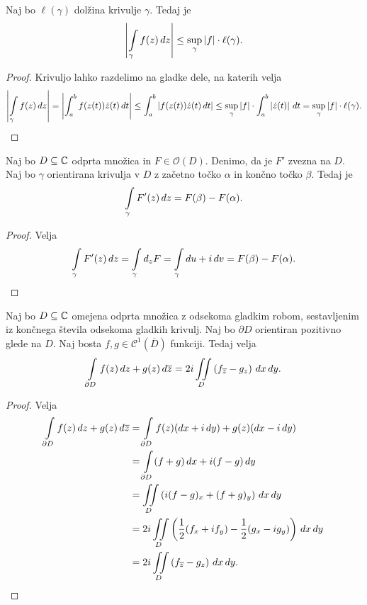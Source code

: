 \begin{trditev}
Naj bo $\ell(\gamma)$ dolžina krivulje $\gamma$. Tedaj je
\[
\left\lvert \int\limits_{\gamma} f(z)\,dz\right\rvert \leq
\sup_{\gamma} \left\lvert f\right\rvert \cdot \ell(\gamma).
\]
\end{trditev}

\begin{proof}
Krivuljo lahko razdelimo na gladke dele, na katerih velja
\[
\left\lvert \int\limits_{\gamma} f(z)\,dz\right\rvert =
\left\lvert \int_a^b f(z(t)) \dot{z}(t)\,dt\right\rvert \leq
\int_a^b \left\lvert f(z(t)) \dot{z}(t)\,dt\right\rvert \leq
\sup_{\gamma} \left\lvert f\right\rvert \cdot \int_a^b \left\lvert \dot{z}(t)\right\rvert\,dt =
\sup_{\gamma} \left\lvert f\right\rvert \cdot \ell(\gamma). \qedhere
\]
\end{proof}

\begin{trditev}
Naj bo $D \subseteq \mathbb{C}$ odprta množica in $F \in \mathcal{O}(D)$.
Denimo, da je $F'$ zvezna na $D$. Naj bo $\gamma$ orientirana
krivulja v $D$ z začetno točko $\alpha$ in končno točko $\beta$.
Tedaj je
\[
\int\limits_{\gamma} F'(z)\,dz = F(\beta) - F(\alpha).
\]
\end{trditev}

\begin{proof}
Velja
\[
\int\limits_{\gamma} F'(z)\,dz =
\int\limits_{\gamma} d_zF =
\int\limits_{\gamma} du + i\,dv =
F(\beta) - F(\alpha). \qedhere
\]
\end{proof}


\begin{izrek}
Naj bo $D \subseteq \mathbb{C}$ omejena odprta množica z odsekoma gladkim
robom, sestavljenim iz končnega števila odsekoma gladkih krivulj.
Naj bo $\partial D$ orientiran pozitivno glede na $D$. Naj bosta
$f, g \in \mathcal{C}^1(\overline{D})$ funkciji. Tedaj velja
\[
\int\limits_{\partial D} f(z)\,dz + g(z)\,d\overline{z} =
2i \iint\limits_D \left(f_{\overline{z}} - g_z\right)\,dx\,dy.
\]
\end{izrek}

\begin{proof}
Velja
\begin{align*}
\int\limits_{\partial D} f(z)\,dz + g(z)\,d\overline{z}
&=
\int\limits_{\partial D} f(z)(dx + i\,dy) + g(z)(dx - i\,dy)
\\
&=
\int\limits_{\partial D} (f+g)\,dx + i(f-g)\,dy
\\
&=
\iint\limits_D \left(i(f-g)_x + (f+g)_y\right)\,dx\,dy
\\
&=
2i \iint\limits_D \left(
\frac{1}{2}(f_x + i f_y) - \frac{1}{2}(g_x - i g_y)\right)\,dx\,dy
\\
&=
2i \iint\limits_D \left(f_{\overline{z}} - g_z\right)\,dx\,dy. \qedhere
\end{align*}
\end{proof}

